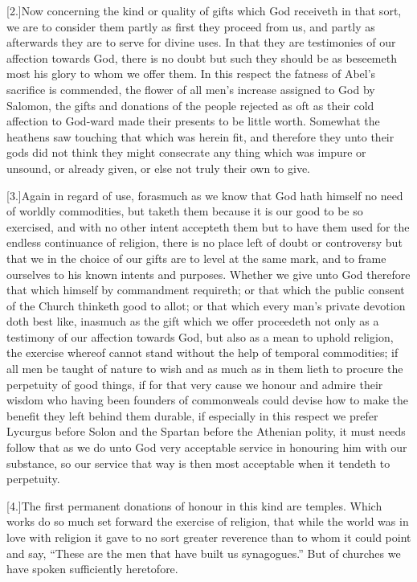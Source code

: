 [2.]Now concerning the kind or quality of gifts which God receiveth in that sort, we are to consider them partly as first they proceed from us, and partly as afterwards they are to serve for divine uses. In that they are testimonies of our affection towards God, there is no doubt but such they should be as beseemeth most his glory to whom we offer them. In this respect the fatness of Abel’s sacrifice is commended, the flower of all men’s increase assigned to God by Salomon,  the gifts and donations of the people rejected as oft as their cold affection to God-ward made their presents to be little worth.
 Somewhat the heathens saw touching that which was herein fit, and therefore they unto their gods did not think they might consecrate any thing which was impure or unsound, or already given, or else not truly their own to give.

[3.]Again in regard of use, forasmuch as we know that God hath himself no need of worldly commodities, but taketh them because it is our good to be so exercised, and with no other intent accepteth them but to have them used for the endless continuance of religion, there is no place left of doubt or controversy but that we in the choice of our gifts are to level at the same mark, and to frame ourselves to his known intents and purposes. Whether we give unto God therefore that which himself by commandment requireth; or that which the public consent of the Church thinketh good to allot; or that which every man’s private devotion doth best like, inasmuch as the gift which we offer proceedeth not only as a testimony of our affection towards God, but also as a mean to uphold religion, the exercise whereof cannot stand without the help of temporal commodities; if all men be taught of nature to wish and as much as in them lieth to procure the perpetuity of good things, if for that very cause we honour and admire their wisdom who having been founders of commonweals could devise how to make the benefit they left behind them durable, if especially in this respect we prefer Lycurgus before Solon and the Spartan before the Athenian polity, it must needs follow that as we do unto God very acceptable service in honouring him with our substance, so our service that way is then most acceptable when it tendeth to perpetuity.

[4.]The first permanent donations of honour in this kind are temples. Which works do so much set forward the exercise of religion, that while the world was in love with  religion it gave to no sort greater reverence than to whom it could point and say,
 “These are the men that have built us synagogues.” But of churches we have spoken sufficiently heretofore.

